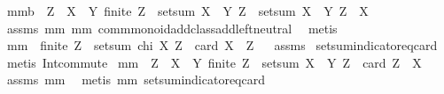 \begin{isabellebody}
{\isafoldproof}%
%
\isadelimproof
%
\endisadelimproof
\isanewline
\isanewline
{}\isamarkupfalse%
\ mm{}{}b{\isacharcolon}\ \ {\isachardoublequoteopen}Z\ {\isasymsubseteq}\ X\ {\isasymunion}\ Y{\isachardoublequoteclose}\ {\isachardoublequoteopen}finite\ Z{\isachardoublequoteclose}\ \ {\isachardoublequoteopen}setsum\ {\isacharparenleft}X\ {\isacharless}{\isacharbar}\ Y{\isacharparenright}\ Z\ {\isacharequal}\ setsum\ {\isacharparenleft}X\ {\isacharless}{\isacharbar}\ Y{\isacharparenright}\ {\isacharparenleft}Z\ {\isasyminter}\ X{\isacharparenright}{\isachardoublequoteclose}\ \isanewline
%
\isadelimproof
%
\endisadelimproof
%
\isatagproof
{}\isamarkupfalse%
\ assms\ mm{}{}\ mm{}{}\ comm{\isacharunderscore}monoid{\isacharunderscore}add{\isacharunderscore}class{\isachardot}add{\isachardot}left{\isacharunderscore}neutral\ \isamarkupfalse%
\ metis%
\endisatagproof
{\isafoldproof}%
%
\isadelimproof
\isanewline
%
\endisadelimproof
\isanewline
{}\isamarkupfalse%
\ mm{}{}{\isacharcolon}\ \ {\isachardoublequoteopen}finite\ Z{\isachardoublequoteclose}\ \ {\isachardoublequoteopen}setsum\ {\isacharparenleft}chi\ X{\isacharparenright}\ Z\ {\isacharequal}\ card\ {\isacharparenleft}X\ {\isasyminter}\ Z{\isacharparenright}{\isachardoublequoteclose}%
\isadelimproof
\ %
\endisadelimproof
%
\isatagproof
{}\isamarkupfalse%
\ assms\ \isanewline
setsum{\isacharunderscore}indicator{\isacharunderscore}eq{\isacharunderscore}card\ \isamarkupfalse%
\ {\isacharparenleft}metis\ Int{\isacharunderscore}commute{\isacharparenright}%
\endisatagproof
{\isafoldproof}%
%
\isadelimproof
%
\endisadelimproof
\isanewline
\isanewline
{}\isamarkupfalse%
\ mm{}{}{\isacharcolon}\ \ {\isachardoublequoteopen}Z\ {\isasymsubseteq}\ X\ {\isasymunion}\ Y{\isachardoublequoteclose}\ {\isachardoublequoteopen}finite\ Z{\isachardoublequoteclose}\ \ {\isachardoublequoteopen}setsum\ {\isacharparenleft}X\ {\isacharless}{\isacharbar}\ Y{\isacharparenright}\ Z\ {\isacharequal}\ card\ {\isacharparenleft}Z\ {\isasyminter}\ X{\isacharparenright}{\isachardoublequoteclose}\isanewline
%
\isadelimproof
%
\endisadelimproof
%
\isatagproof
{}\isamarkupfalse%
\ assms\ mm{}{}\ \isamarkupfalse%
\ {\isacharparenleft}metis\ mm{}{}\ setsum{\isacharunderscore}indicator{\isacharunderscore}eq{\isacharunderscore}card{\isacharparenright}%

\end{isabellebody}
